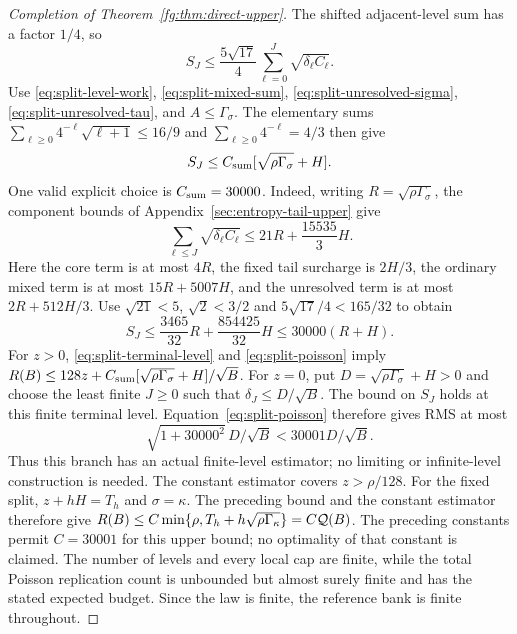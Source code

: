 \begin{proof}[Completion of Theorem~\ref{fg:thm:direct-upper}]
The shifted adjacent-level sum has a factor $1/4$, so
\[
 S_J\le\frac{5\sqrt{17}}4
                \sum_{\ell=0}^J\sqrt{\delta_\ell C_\ell}.
\]
Use \eqref{eq:split-level-work}, \eqref{eq:split-mixed-sum},
\eqref{eq:split-unresolved-sigma}, \eqref{eq:split-unresolved-tau},
and $A\le\Gamma_\sigma$. The elementary sums
$\sum_{\ell\ge0}4^{-\ell}\sqrt{\ell+1}\le16/9$ and
$\sum_{\ell\ge0}4^{-\ell}=4/3$ then give
\[
 S_J\le C_{\rm sum}[\sqrt{\rho\Gamma_\sigma}+H].
\]
One valid explicit choice is $C_{\rm sum}=30000$. Indeed, writing
$R=\sqrt{\rho\Gamma_\sigma}$, the component bounds of
Appendix~\ref{sec:entropy-tail-upper} give
\[
 \sum_{\ell\le J}\sqrt{\delta_\ell C_\ell}
 \le21R+\frac{15535}{3}H.
\]
Here the core term is at most $4R$, the fixed tail surcharge is $2H/3$,
the ordinary mixed term is at most $15R+5007H$, and the unresolved
term is at most $2R+512H/3$. Use $\sqrt{21}<5$, $\sqrt2<3/2$ and
$5\sqrt{17}/4<165/32$ to obtain
\[
 S_J\le\frac{3465}{32}R+\frac{854425}{32}H
       \le30000(R+H).
\]
For $z>0$, \eqref{eq:split-terminal-level} and
\eqref{eq:split-poisson} imply
$R(B)\le128z+C_{\rm sum}[\sqrt{\rho\Gamma_\sigma}+H]/\sqrt B$.
For $z=0$, put $D=\sqrt{\rho\Gamma_\sigma}+H>0$ and choose the least
finite $J\ge0$ such that $\delta_J\le D/\sqrt B$. The bound on $S_J$
holds at this finite terminal level. Equation~\eqref{eq:split-poisson}
therefore gives RMS at most
\[
 \sqrt{1+30000^2}\,D/\sqrt B<30001D/\sqrt B.
\]
Thus this branch has an actual finite-level estimator; no limiting
or infinite-level construction is needed.
The constant estimator covers $z>\rho/128$.
For the fixed split, $z+hH=T_h$ and $\sigma=\kappa$.
The preceding bound and the constant estimator therefore give
$R(B)\le C\min\{\rho,T_h+h\sqrt{\rho\Gamma_\kappa}\}=C\mathcal Q(B)$.
The preceding constants permit $C=30001$ for this upper bound; no
optimality of that constant is claimed. The number of levels and every
local cap are finite, while the total Poisson replication count is
unbounded but almost surely finite and has the stated expected budget.
Since the law is finite, the reference bank is finite throughout.
\end{proof}
